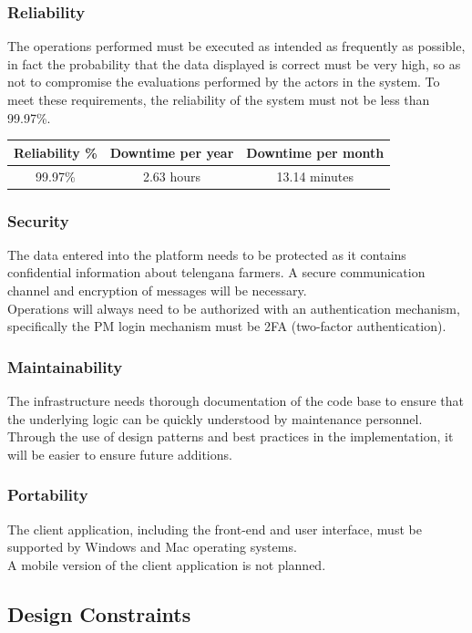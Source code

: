 \documentclass[10pt]{article}
\begin{document}
\subsubsection{Reliability}
The operations performed must be executed as intended as frequently as possible, in fact the probability that the data displayed is correct must be 
very high, so as not to compromise the evaluations performed by the actors in the system. To meet these requirements, the reliability of the system must 
not be less than 99.97\%.
\begin{center}
    \begin{tabular}{|c c c|} 
    \hline
    Reliability \% & Downtime per year & Downtime per month\\ 
    \hline
    99.97\%  & 2.63 hours & 13.14 minutes\\ 
    \hline
    \end{tabular}
\end{center}
\subsubsection{Security}
The data entered into the platform needs to be protected as it contains confidential information about telengana farmers. A secure communication channel and encryption of messages will be necessary.\\
Operations will always need to be authorized with an authentication mechanism, specifically the PM login mechanism must be 2FA (two-factor authentication).
\subsubsection{Maintainability}
The infrastructure needs thorough documentation of the code base to ensure that the underlying logic can be quickly understood by maintenance personnel.\\
Through the use of design patterns and best practices in the implementation, it will be easier to ensure future additions.
\subsubsection{Portability}
The client application, including the front-end and user interface, must be supported by Windows and Mac operating systems. \\
A mobile version of the client application is not planned.
\subsection{Design Constraints}
\end{document}
